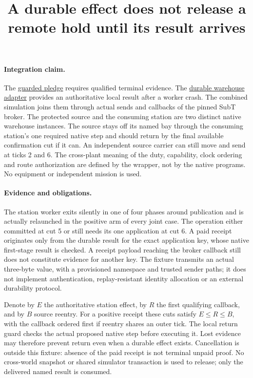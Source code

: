 \documentclass{article}
\title{A durable effect does not release a remote hold until its result arrives}
\begin{document}
\maketitle

\paragraph{Integration claim.}
The \href{https://github.com/eternal-november/eos-research-programmes/pull/631}{guarded pledge}
requires qualified terminal evidence. The
\href{https://github.com/eternal-november/eos-research-programmes/pull/633}{durable warehouse adapter}
provides an authoritative local result after a worker crash. The
combined simulation joins them through actual sends and callbacks of
the pinned SubT broker. The protected source and the consuming station
are two distinct native warehouse instances. The source stays off its
named bay through the consuming station's one required native step
and should return by the final available confirmation cut if it can.
An independent source carrier can still move and send at ticks 2 and 6.
The cross-plant meaning of the duty, capability, clock ordering and
route authorization are defined by the wrapper, not by the native
programs. No equipment or independent mission is used.

\paragraph{Evidence and obligations.}
The station worker exits silently in one of four phases around
publication and is actually relaunched in the positive arm of every
joint case. The operation either committed at cut 5 or still needs its
one application at cut 6. A paid receipt originates only from the
durable result for the exact application key, whose native first-stage
result is checked. A receipt payload reaching the broker callback still
does not constitute evidence for another key. The fixture transmits
an actual three-byte value, with a provisioned namespace and trusted
sender paths; it does not implement authentication, replay-resistant
identity allocation or an external durability protocol.

Denote by $E$ the authoritative station effect, by $R$ the first
qualifying callback, and by $B$ source reentry. For a positive receipt
these cuts satisfy $E\le R\le B$, with the callback ordered first if
reentry shares an outer tick. The local return guard checks the actual
proposed native step before executing it. Lost evidence may therefore
prevent return even when a durable effect exists. Cancellation is
outside this fixture: absence of the paid receipt is not terminal
unpaid proof. No cross-world snapshot or shared simulator transaction
is used to release; only the delivered named result is consumed.
\end{document}
